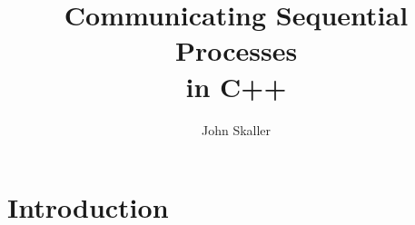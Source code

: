 \documentclass[oneside]{book}
\title{Communicating Sequential Processes\\ in C++}
\author{John Skaller}
\begin{document}
\maketitle
\tableofcontents
\chapter{Introduction}
\end{document}
